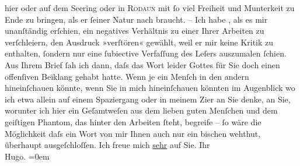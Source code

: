 \begin{ledgroupsized}[t]{13cm}
               hier oder auf dem Se{\geminationm}ering oder in \textsc{Rodaun} mit ſo viel Freiheit und Munterkeit zu Ende zu {\pb}bringen, als er ſeiner Natur nach
               braucht.\pend
           \pstart
           \numberlinefalse{}–\numberlinetrue{}\pend
           \pstart
           Ich habe \label{K_L01789_1v}\label{K_L01789_1h}, als es mir unanſtändig erſchien, ein negatives Verhältnis zu einer
               Ihrer Arbeiten zu verſchleiern,
               den Ausdruck »verſtören« gewählt, weil er mir keine Kritik zu enthalten, ſondern nur
               eine ſubiective Verfaſſung des Leſers auszumalen ſchien. Aus Ihrem Brief ſah ich
               dann, daſs das Wort leider Gottes für Sie doch einen offenſiven {\pb}Beiklang gehabt hatte.\pend
           \pstart
           Wenn je ein Menſch in den andern hineinſchauen könnte, wenn Sie in mich hineinſchauen
               könnten im Augenblick wo ich etwa allein auf einem Spaziergang oder in meinem Zi{\geminationm}er an Sie denke, an Sie, worunter ich hier ein
               Geſamtweſen aus dem lieben guten Menſchen und dem geiſtigen Phantom, das hinter den
               Arbeiten ſteht, begreife – ſo wäre die Möglichkeit daſs ein Wort von mir Ihnen auch
               nur ein bischen wehthut, überhaupt ausgeſchloſſen.\pend
           \pstart
           Ich freue mich \uline{sehr} auf Sie.\pend
           \pstart
           Ihr{\\[\baselineskip]}\spacefill\mbox{Hugo.}\pend
           \leftskip=0em{}
         
         \endnumbering{}\end{ledgroupsized}  \newcommand{\dateiname}{L01789}\newcommand{\titel}{Hugo von Hofmannsthal an Arthur Schnitzler, 14. 9. [1908]}\newcommand{\editorInnen}{Martin Anton Müller und Gerd-Hermann Susen}
      